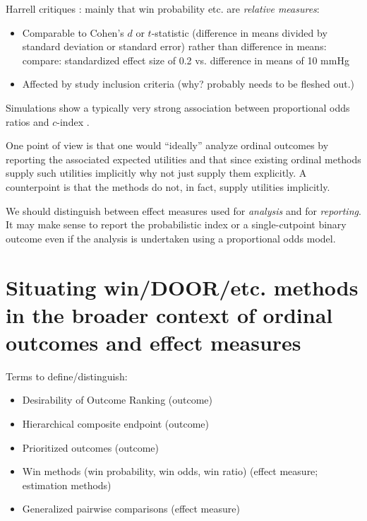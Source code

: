 \documentclass[
  11pt,
  fleqn
]{article}
\begin{document}
Harrell critiques \citep{harrellOverviewCompositeOutcome2024,
harrellRareDegenerativeDiseases2024, harrellViewsCompositeOutcome}: mainly that
win probability etc. are \emph{relative measures}:

\begin{itemize}
  \item Comparable to Cohen's $d$ or $t$-statistic (difference in
    means divided by standard deviation or standard error) rather than
    difference in means: compare: standardized effect size of 0.2 vs.
    difference in means of 10 mmHg
  \item Affected by study inclusion criteria (why? probably needs to
    be fleshed out.)
\end{itemize}

Simulations show a typically very strong association between
proportional odds ratios and $c$-index
\citep{harrellViolationProportionalOdds2020}.

One point of view is that one would ``ideally'' analyze ordinal
outcomes by reporting the associated expected utilities  and that since
existing ordinal methods supply such utilities implicitly why not
just supply them explicitly. A counterpoint is that the methods do not, in fact,
supply utilities implicitly.

We should distinguish between effect measures used for \emph{analysis} and for
\emph{reporting}. It may make sense to report the probabilistic index or a
single-cutpoint binary outcome even if the analysis is undertaken using a
proportional odds model.

\section{Situating win/DOOR/etc. methods in the broader context of ordinal
outcomes and effect measures}

Terms to define/distinguish:
\begin{itemize}
  \item Desirability of Outcome Ranking (outcome)
  \item Hierarchical composite endpoint (outcome)
  \item Prioritized outcomes (outcome)
  \item Win methods (win probability, win odds, win ratio) (effect
    measure; estimation methods)
  \item Generalized pairwise comparisons (effect measure)
\end{itemize}
\end{document}

